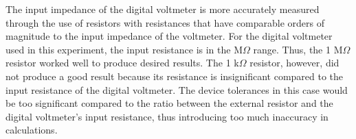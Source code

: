 The input impedance of the digital voltmeter is more accurately measured through the use of resistors with resistances that have comparable orders of magnitude to the input impedance of the voltmeter. For the digital voltmeter used in this experiment, the input resistance is in the M$\Omega$ range. Thus, the 1 M$\Omega$ resistor worked well to produce desired results. The 1 k$\Omega$ resistor, however, did not produce a good result because its resistance is insignificant compared to the input resistance of the digital voltmeter. The device tolerances in this case would be too significant compared to the ratio between the external resistor and the digital voltmeter's input resistance, thus introducing too much inaccuracy in calculations.
